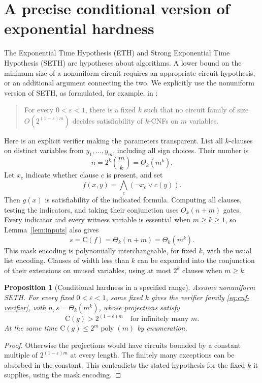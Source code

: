 \documentclass[11pt]{article}
\newtheorem{proposition}[theorem]{Proposition}
\theoremstyle{definition}
\theoremstyle{remark}
\newcommand{\C}{\mathrm{C}}
\newcommand{\poly}{\operatorname{poly}}
\newcommand{\AND}{\bigwedge}
\begin{document}
\section{A precise conditional version of exponential hardness}

The Exponential Time Hypothesis (ETH) and Strong Exponential Time
Hypothesis (SETH) are hypotheses about algorithms. A lower bound
on the minimum size of a nonuniform circuit requires an appropriate
circuit hypothesis, or an additional argument connecting the two.
We explicitly use the nonuniform version of SETH, as formulated, for
example, in \citet[Definition~2.9]{CVP2019}:

\begin{quote}
For every $0<\varepsilon<1$, there is a fixed $k$ such that no circuit
family of size $O(2^{(1-\varepsilon)m})$ decides satisfiability of
$k$-CNFs on $m$ variables.
\end{quote}

Here is an explicit verifier making the parameters transparent.
List all $k$-clauses on distinct variables from $y_1,\ldots,y_m$,
including all sign choices. Their number is
\[
 n=2^k\binom{m}{k}=\Theta_k(m^k).
\]
Let $x_c$ indicate whether clause $c$ is present, and set
\begin{equation}\label{eq:cnf-verifier}
 f(x,y)=\AND_c(\neg x_c\lor c(y)).
\end{equation}
Then $g(x)$ is satisfiability of the indicated formula. Computing all
clauses, testing the indicators, and taking their conjunction uses
$O_k(n+m)$ gates. Every indicator and every witness variable is
essential when $m\ge k\ge1$, so Lemma~\ref{lem:inputs} also gives
\begin{equation}\label{eq:cnf-size}
 s=\C(f)=\Theta_k(n+m)=\Theta_k(m^k).
\end{equation}
This mask encoding is polynomially interchangeable, for fixed $k$,
with the usual list encoding. Clauses of width less than $k$ can be
expanded into the conjunction of their extensions on unused variables,
using at most $2^k$ clauses when $m\ge k$.

\begin{proposition}[Conditional hardness in a specified range]
Assume nonuniform SETH. For every fixed $0<\varepsilon<1$, some fixed
$k$ gives the verifier family \eqref{eq:cnf-verifier}, with
$n,s=\Theta_k(m^k)$, whose projections satisfy
\begin{equation}\label{eq:conditional-lower}
 \C(g)>2^{(1-\varepsilon)m}
 \quad\text{for infinitely many }m.
\end{equation}
At the same time $\C(g)\le2^m\poly(m)$ by enumeration.
\end{proposition}
\begin{proof}
Otherwise the projections would have circuits bounded by a constant
multiple of $2^{(1-\varepsilon)m}$ at every length. The finitely many
exceptions can be absorbed in the constant. This contradicts the
stated hypothesis for the fixed $k$ it supplies, using the mask
encoding.
\end{proof}
\end{document}
